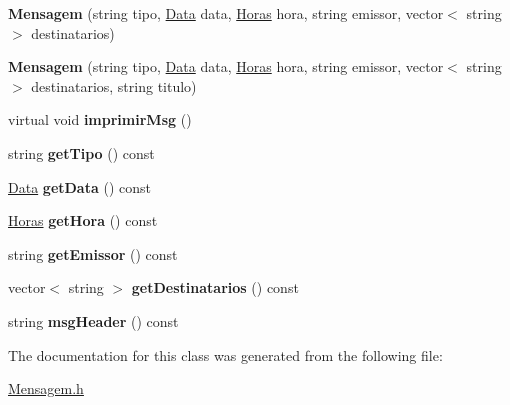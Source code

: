 \begin{DoxyCompactItemize}
\item 
\hypertarget{class_mensagem_a9cf63e7a97a5332db5f224880c88c384}{}{\bfseries Mensagem} (string tipo, \hyperlink{class_data}{Data} data, \hyperlink{class_horas}{Horas} hora, string emissor, vector$<$ string $>$ destinatarios)\label{class_mensagem_a9cf63e7a97a5332db5f224880c88c384}

\item 
\hypertarget{class_mensagem_ae0cf02540c54277a6f85c5c7ff411fcb}{}{\bfseries Mensagem} (string tipo, \hyperlink{class_data}{Data} data, \hyperlink{class_horas}{Horas} hora, string emissor, vector$<$ string $>$ destinatarios, string titulo)\label{class_mensagem_ae0cf02540c54277a6f85c5c7ff411fcb}

\item 
\hypertarget{class_mensagem_acca688cab2a2dbb2ca457158efc20a39}{}virtual void {\bfseries imprimir\+Msg} ()\label{class_mensagem_acca688cab2a2dbb2ca457158efc20a39}

\item 
\hypertarget{class_mensagem_a8bc741656cce63923a56d9498e371a54}{}string {\bfseries get\+Tipo} () const \label{class_mensagem_a8bc741656cce63923a56d9498e371a54}

\item 
\hypertarget{class_mensagem_a8d3b52e1c20fac96c4df60c79b5b7846}{}\hyperlink{class_data}{Data} {\bfseries get\+Data} () const \label{class_mensagem_a8d3b52e1c20fac96c4df60c79b5b7846}

\item 
\hypertarget{class_mensagem_a7285a85c11aea596e25c6f87a68ad86f}{}\hyperlink{class_horas}{Horas} {\bfseries get\+Hora} () const \label{class_mensagem_a7285a85c11aea596e25c6f87a68ad86f}

\item 
\hypertarget{class_mensagem_a5438dfe93aec2e6512042704e134d5db}{}string {\bfseries get\+Emissor} () const \label{class_mensagem_a5438dfe93aec2e6512042704e134d5db}

\item 
\hypertarget{class_mensagem_a936ae478a7e322b92e12e8eaabae0c13}{}vector$<$ string $>$ {\bfseries get\+Destinatarios} () const \label{class_mensagem_a936ae478a7e322b92e12e8eaabae0c13}

\item 
\hypertarget{class_mensagem_aa4cf61d603448660470ac889ebe58b71}{}string {\bfseries msg\+Header} () const \label{class_mensagem_aa4cf61d603448660470ac889ebe58b71}

\end{DoxyCompactItemize}


The documentation for this class was generated from the following file\+:\begin{DoxyCompactItemize}
\item 
\hyperlink{_mensagem_8h}{Mensagem.\+h}\end{DoxyCompactItemize}

